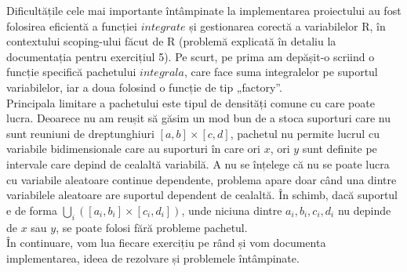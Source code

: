 \documentclass[12pt]{article}
\begin{document}
\indent Dificultățile cele mai importante întâmpinate la implementarea proiectului au fost folosirea eficientă a funcției $integrate$ și gestionarea corectă a variabilelor R, în contextului scoping-ului făcut de R (problemă explicată în detaliu la documentația pentru exercițiul 5). Pe scurt, pe prima am depășit-o scriind o funcție specifică pachetului $integrala$, care face suma integralelor pe suportul variabilelor, iar a doua folosind o funcție de tip „factory”. \\
\indent Principala limitare a pachetului este tipul de densități comune cu care poate lucra. Deoarece nu am reușit să găsim un mod bun de a stoca suporturi care nu sunt reuniuni de dreptunghiuri $[a, b] \times [c, d]$, pachetul nu permite lucrul cu variabile bidimensionale care au suporturi în care ori $x$, ori $y$ sunt definite pe intervale care depind de cealaltă variabilă. A nu se înțelege că nu se poate lucra cu variabile aleatoare continue dependente, problema apare doar când una dintre variabilele aleatoare are suportul dependent de cealaltă. În schimb, dacă suportul e de forma $\displaystyle \bigcup\limits_{i} ([a_i, b_i] \times [c_i, d_i])$, unde niciuna dintre $a_i, b_i, c_i, d_i$ nu depinde de $x$ sau $y$, se poate folosi fără probleme pachetul. \\
\indent În continuare, vom lua fiecare exercițiu pe rând și vom documenta implementarea, ideea de rezolvare și problemele întâmpinate. \\
\end{document}
